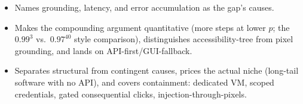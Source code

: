 \begin{interviewq}

\goodgreat
\begin{itemize}
    \item {} Names grounding, latency, and error accumulation as the gap's causes.
    \item {} Makes the compounding argument quantitative (more steps at lower $p$; the $0.99^3$ vs.\ $0.97^{40}$ style comparison), distinguishes accessibility-tree from pixel grounding, and lands on API-first/GUI-fallback.
    \item {} Separates structural from contingent causes, prices the actual niche (long-tail software with no API), and covers containment: dedicated VM, scoped credentials, gated consequential clicks, injection-through-pixels.
\end{itemize}

\end{interviewq}


